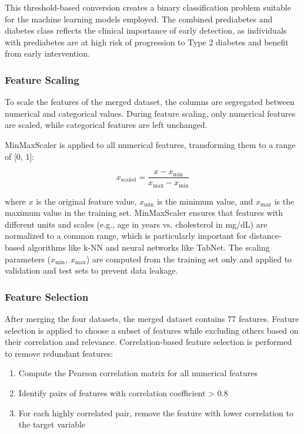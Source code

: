 This threshold-based conversion creates a binary classification problem suitable for the machine learning models employed. The combined prediabetes and diabetes class reflects the clinical importance of early detection, as individuals with prediabetes are at high risk of progression to Type 2 diabetes and benefit from early intervention.

\subsubsection{Feature Scaling}

To scale the features of the merged dataset, the columns are segregated between numerical and categorical values. During feature scaling, only numerical features are scaled, while categorical features are left unchanged.

MinMaxScaler is applied to all numerical features, transforming them to a range of [0, 1]:

$$x_{\mathrm{scaled}} = \frac{x - x_{\min}}{x_{\max} - x_{\min}}$$

where $x$ is the original feature value, $x_{\min}$ is the minimum value, and $x_{\max}$ is the maximum value in the training set. MinMaxScaler ensures that features with different units and scales (e.g., age in years vs. cholesterol in mg/dL) are normalized to a common range, which is particularly important for distance-based algorithms like k-NN and neural networks like TabNet. The scaling parameters ($x_{\min}$, $x_{\max}$) are computed from the training set only and applied to validation and test sets to prevent data leakage.

\subsubsection{Feature Selection}

After merging the four datasets, the merged dataset contains 77 features. Feature selection is applied to choose a subset of features while excluding others based on their correlation and relevance. Correlation-based feature selection is performed to remove redundant features:

\begin{enumerate}
    \item Compute the Pearson correlation matrix for all numerical features
    \item Identify pairs of features with correlation coefficient > 0.8
    \item For each highly correlated pair, remove the feature with lower correlation to the target variable
\end{enumerate}

